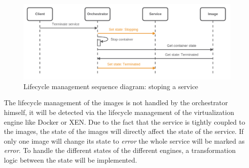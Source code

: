 \begin{figure}[H]
    \centering
    \includegraphics[width=\textwidth]{resources/images/lifecycle_sequence_diagram_stop_service.png}
    \caption[Lifecycle management sequence diagram: stoping a service]{Lifecycle management sequence diagram: stoping a service}
    \label{fig:lifecycle_mgm_squence_diagram_stop_service}
\end{figure}

The lifecycle management of the images is not handled by the orchestrator himself, it will be detected via the lifecycle management of the virtualization engine like Docker or XEN.
Due to the fact that the service is tightly coupled to the images, the state of the images will directly affect the state of the service.
If only one image will change its state to \textit{error} the whole service will be marked as \textit{error}.
To handle the different states of the different engines, a transformation logic between the state will be implemented.


